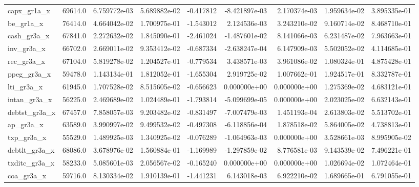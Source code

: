 \documentclass[10pt]{article}
\begin{document}
\begin{landscape}
\begin{longtable}{lrrrrrrrr}
capx\_gr1a\_x             &   69614.0 &  6.759772e-03 &  5.689882e-02 &     -0.417812 & -8.421897e-03 &  2.170374e-03 &  1.959634e-02 &  3.895335e-01 \\
be\_gr1a\_x               &   76414.0 &  4.664042e-02 &  1.700975e-01 &     -1.543012 &  2.124536e-03 &  3.243210e-02 &  9.160714e-02 &  8.468710e-01 \\
cash\_gr3a\_x             &   67841.0 &  2.272632e-02 &  1.845090e-01 &     -2.461024 & -1.487601e-02 &  8.141066e-03 &  6.231487e-02 &  7.963663e-01 \\
inv\_gr3a\_x              &   66702.0 &  2.669011e-02 &  9.353412e-02 &     -0.687334 & -2.638247e-04 &  6.147909e-03 &  5.502052e-02 &  4.114685e-01 \\
rec\_gr3a\_x              &   67104.0 &  5.819278e-02 &  1.204527e-01 &     -0.779534 &  3.438571e-03 &  3.961086e-02 &  1.080324e-01 &  4.875428e-01 \\
ppeg\_gr3a\_x             &   59478.0 &  1.143134e-01 &  1.812052e-01 &     -1.655304 &  2.919725e-02 &  1.007662e-01 &  1.924517e-01 &  8.332787e-01 \\
lti\_gr3a\_x              &   61945.0 &  1.707528e-02 &  8.515605e-02 &     -0.656623 &  0.000000e+00 &  0.000000e+00 &  1.275369e-02 &  4.683121e-01 \\
intan\_gr3a\_x            &   56225.0 &  2.469689e-02 &  1.024489e-01 &     -1.793814 & -5.099699e-05 &  0.000000e+00 &  2.023025e-02 &  6.632143e-01 \\
debtst\_gr3a\_x           &   67457.0 &  7.858057e-03 &  9.203482e-02 &     -0.831497 & -7.007479e-03 &  1.451193e-04 &  2.613803e-02 &  5.513702e-01 \\
ap\_gr3a\_x               &   63589.0 &  3.990997e-02 &  9.499532e-02 &     -0.497308 & -6.118856e-04 &  1.878518e-02 &  5.864005e-02 &  4.738813e-01 \\
txp\_gr3a\_x              &   55529.0 &  1.489925e-03 &  1.340925e-02 &     -0.076289 & -1.064963e-03 &  0.000000e+00 &  3.528661e-03 &  8.995905e-02 \\
debtlt\_gr3a\_x           &   68086.0 &  3.678976e-02 &  1.560884e-01 &     -1.169989 & -1.297859e-02 &  8.776581e-03 &  9.143539e-02 &  7.496221e-01 \\
txditc\_gr3a\_x           &   58233.0 &  5.085601e-03 &  2.056567e-02 &     -0.165240 &  0.000000e+00 &  0.000000e+00 &  1.026694e-02 &  1.072464e-01 \\
coa\_gr3a\_x              &   59716.0 &  8.130334e-02 &  1.910139e-01 &     -1.441231 &  6.143018e-03 &  6.922210e-02 &  1.689665e-01 &  6.791055e-01 \\

\end{longtable}
\end{landscape}
\end{document}
